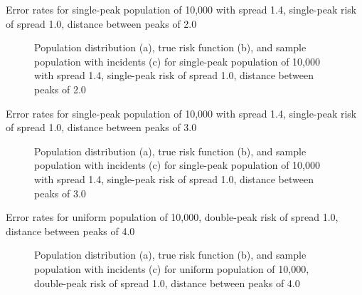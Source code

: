 \begin{table}[H]
    
    \caption[]{Error rates for single-peak population of 10,000 with \gls{spread} 1.4, single-peak risk of \gls{spread} 1.0, distance between peaks of 2.0}
    \label{tab:mean_error_rates:p1.4_100_1_1h_2s}
\end{table}

\begin{figure}[H]
    
    \caption[]{Population distribution (a), true risk function (b), and sample population with incidents (c) for single-peak population of 10,000 with \gls{spread} 1.4, single-peak risk of \gls{spread} 1.0, distance between peaks of 2.0}
    \label{fig:distributions:p1.4_100_1_1h_2s}    
\end{figure}


\begin{table}[H]
    
    \caption[]{Error rates for single-peak population of 10,000 with \gls{spread} 1.4, single-peak risk of \gls{spread} 1.0, distance between peaks of 3.0}
    \label{tab:mean_error_rates:p1.4_100_1_1h_3s}
\end{table}

\begin{figure}[H]
    
    \caption[]{Population distribution (a), true risk function (b), and sample population with incidents (c) for single-peak population of 10,000 with \gls{spread} 1.4, single-peak risk of \gls{spread} 1.0, distance between peaks of 3.0}
    \label{fig:distributions:p1.4_100_1_1h_3s}    
\end{figure}


\begin{table}[H]
    
    \caption[]{Error rates for uniform population of 10,000, double-peak risk of spread 1.0, distance between peaks of 4.0}
    \label{tab:mean_error_rates:p1.4_100_1_1h_4s}
\end{table}

\begin{figure}[H]
    
    \caption[]{Population distribution (a), true risk function (b), and sample population with incidents (c) for uniform population of 10,000, double-peak risk of \gls{spread} 1.0, distance between peaks of 4.0}
    \label{fig:distributions:p1.4_100_1_1h_4s}    
\end{figure}

\setpath{}